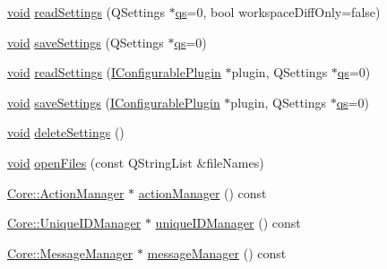 \begin{DoxyCompactItemize}
\item 
\hyperlink{group___u_a_v_objects_plugin_ga444cf2ff3f0ecbe028adce838d373f5c}{void} \hyperlink{group___core_plugin_gadef90c414cbb6c8ddb7bd051ac4f6dd3}{read\-Settings} (Q\-Settings $\ast$\hyperlink{analyze_i_n_s_g_p_s_8m_a620a138c8981e0536c569d7761df4548}{qs}=0, bool workspace\-Diff\-Only=false)
\item 
\hyperlink{group___u_a_v_objects_plugin_ga444cf2ff3f0ecbe028adce838d373f5c}{void} \hyperlink{group___core_plugin_ga1400c8a8dc0525a89892b399cdbe00dd}{save\-Settings} (Q\-Settings $\ast$\hyperlink{analyze_i_n_s_g_p_s_8m_a620a138c8981e0536c569d7761df4548}{qs}=0)
\item 
\hyperlink{group___u_a_v_objects_plugin_ga444cf2ff3f0ecbe028adce838d373f5c}{void} \hyperlink{group___core_plugin_ga73d4a9b5000444898214e4cd5e9c4ba2}{read\-Settings} (\hyperlink{class_core_1_1_i_configurable_plugin}{I\-Configurable\-Plugin} $\ast$plugin, Q\-Settings $\ast$\hyperlink{analyze_i_n_s_g_p_s_8m_a620a138c8981e0536c569d7761df4548}{qs}=0)
\item 
\hyperlink{group___u_a_v_objects_plugin_ga444cf2ff3f0ecbe028adce838d373f5c}{void} \hyperlink{group___core_plugin_gabaed765ca937cc2a9a6656707af51b73}{save\-Settings} (\hyperlink{class_core_1_1_i_configurable_plugin}{I\-Configurable\-Plugin} $\ast$plugin, Q\-Settings $\ast$\hyperlink{analyze_i_n_s_g_p_s_8m_a620a138c8981e0536c569d7761df4548}{qs}=0)
\item 
\hyperlink{group___u_a_v_objects_plugin_ga444cf2ff3f0ecbe028adce838d373f5c}{void} \hyperlink{group___core_plugin_ga3bc533033d8d849099ecd1d2bb5d7b6f}{delete\-Settings} ()
\item 
\hyperlink{group___u_a_v_objects_plugin_ga444cf2ff3f0ecbe028adce838d373f5c}{void} \hyperlink{group___core_plugin_ga26342c43079bad17c540757728d3f897}{open\-Files} (const Q\-String\-List \&file\-Names)
\item 
\hyperlink{class_core_1_1_action_manager}{Core\-::\-Action\-Manager} $\ast$ \hyperlink{group___core_plugin_gab47ff8e0a661aec0be5a11339f13bdf0}{action\-Manager} () const 
\item 
\hyperlink{class_core_1_1_unique_i_d_manager}{Core\-::\-Unique\-I\-D\-Manager} $\ast$ \hyperlink{group___core_plugin_gaa5443b3dddc907144dda5a741fa107e1}{unique\-I\-D\-Manager} () const 
\item 
\hyperlink{class_core_1_1_message_manager}{Core\-::\-Message\-Manager} $\ast$ \hyperlink{group___core_plugin_ga56d56321cb281f54cc235519ea59a8ad}{message\-Manager} () const 
\item 

\end{DoxyCompactItemize}
